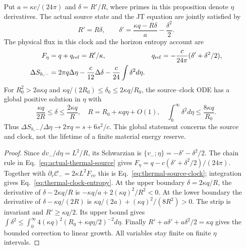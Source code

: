 \begin{proposition}
\label{prop:thermal-source-clock}
Put $a=\kappa c/(24\pi)$ and $\delta=R'/R$, where primes in this
proposition denote $\eta$ derivatives. The actual source state and the
JT equation are jointly satisfied by
\begin{equation}\label{eq:thermal-source-clock}
 R'=R\delta,\qquad
 \delta'=\frac{\kappa q-R\delta}{a}-\frac{\delta^2}{2}.
\end{equation}
The physical flux in this clock and the horizon entropy account are
\begin{align}
 F_\eta&=q+q_{\rm ref}=R'/\kappa,&
 q_{\rm ref}&=-\frac{c}{24\pi}(\delta'+\delta^2/2),\nonumber\\
 \Delta S_{h,-}&=2\pi q\Delta\eta
       -\frac c{12}\Delta\delta
       -\frac c{24}\int\delta^2d\eta.
                    \label{eq:thermal-clock-entropy}
\end{align}
For $R_0^2>2a\kappa q$ and
$\kappa q/(2R_0)\le\delta_0\le2\kappa q/R_0$, the source--clock ODE
has a global positive solution in $\eta$ with
\begin{equation}\label{eq:thermal-clock-growth}
 \frac{\kappa q}{2R}\le\delta\le\frac{2\kappa q}{R},\quad
 R=R_0+\kappa q\eta+O(1),\quad
 \int_0^\infty\delta^2d\eta\le\frac{8\kappa q}{R_0}.
\end{equation}
Thus $\Delta S_{h,-}/\Delta\eta\to2\pi q=s+6s^2/c$.
This global statement concerns the source and clock, not the lifetime
of a finite material energy reserve.
\end{proposition}
\begin{proof}
Since $dv_-/d\eta=L^2/R$, its Schwarzian is
$\{v_-;\eta\}=-\delta'-\delta^2/2$.
The chain rule in Eq.~\eqref{eq:actual-thermal-source} gives
$F_\eta=q-c(\delta'+\delta^2/2)/(24\pi)$.
Together with $\partial_v\mathcal C_-=2\kappa L^2F_{vv}$ this is
Eq.~\eqref{eq:thermal-source-clock}; integration gives
Eq.~\eqref{eq:thermal-clock-entropy}.
At the upper boundary $\delta=2\kappa q/R$, the derivative of
$\delta-2\kappa q/R$ is
$-\kappa q/a+2(\kappa q)^2/R^2<0$.
At the lower boundary the derivative of
$\delta-\kappa q/(2R)$ is
$\kappa q/(2a)+(\kappa q)^2/(8R^2)>0$.
The strip is invariant and $R'\ge\kappa q/2$.
Its upper bound gives
$\int\delta^2\le\int_0^\infty4(\kappa q)^2
 (R_0+\kappa q\eta/2)^{-2}d\eta$.
Finally $R'+a\delta'+a\delta^2/2=\kappa q$ gives the bounded correction
to linear growth. All variables stay finite on finite $\eta$ intervals.
\end{proof}

